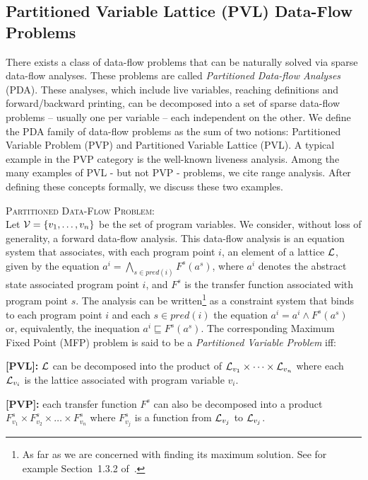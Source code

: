 \subsection{Partitioned Variable Lattice (PVL) Data-Flow Problems}
\label{sec:ssi:pereira:pvpPvl}

There exists a class of data-flow problems that can be naturally solved via sparse data-flow analyses.
These problems are called {\em Partitioned Data-flow Analyses} (PDA).
These analyses, which include live variables, reaching definitions and forward/backward printing, can be decomposed into a set of sparse data-flow problems -- usually one per variable -- each independent on the other.
We define the PDA family of data-flow problems as the sum of two notions: Partitioned Variable Problem (PVP) and Partitioned Variable Lattice (PVL).
A typical example in the PVP category is the well-known liveness analysis.
Among the many examples of PVL - but not PVP - problems, we cite range analysis.
After defining these concepts formally, we discuss these two examples.

\begin{definition}
\label{pro:pvp}
\textsc{Partitioned Data-Flow Problem}:\\Let ${\cal V}=\{v_1,\dots,v_n\}$ be the set of program variables.
We consider, without loss of generality, a forward data-flow analysis.
This data-flow analysis is an equation system that associates, with each program point $i$, an element of a lattice ${\cal L}$, given by the equation $a^i = \bigwedge_{s \in \mathit{pred}(i)} F^s(a^s)$, where $a^i$ denotes the abstract state associated  program point $i$, and $F^s$ is the transfer function associated with program point $s$.
The analysis can be written\footnote{As far as we are concerned with finding its maximum solution. See for example Section~1.3.2 of~\cite{Nielson05}.} as a constraint system that binds to each program point $i$ and each $s\in \mathit{pred}(i)$ the equation $a^i = a^i \wedge  F^s(a^s)$ or, equivalently, the inequation $a^i \sqsubseteq  F^s(a^s)$.
The corresponding Maximum Fixed Point (MFP) problem is said to be a \emph{Partitioned Variable Problem} iff:
\begin{description}
\item {\bf [PVL]:} $\cal L$ can be decomposed into the product of ${\cal L}_{v_1}\times \dots \times {\cal L}_{v_n}$ where each ${\cal L}_{v_i}$ is the lattice associated with program variable $v_i$.
\item {\bf [PVP]:} each transfer function $F^s$ can also be decomposed into a product $F_{v_1}^s\times F_{v_2}^s \times \dots \times F_{v_n}^s$ where $F_{v_j}^s$ is a function from ${\cal L}_{v_j}$ to ${\cal L}_{v_j}$.
\end{description}
\end{definition}

